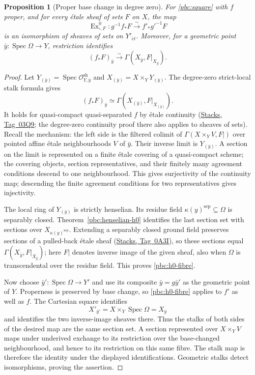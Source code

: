 \documentclass[11pt,a4paper]{article}
\numberwithin{equation}{section}
\newtheorem{proposition}[theorem]{Proposition}
\theoremstyle{definition}
\theoremstyle{remark}
\newcommand{\et}{\acute{e}t}
\newcommand{\stacks}[1]{\href{https://stacks.math.columbia.edu/tag/#1}{\textnormal{Stacks, Tag~#1}}}
\begin{document}
\begin{proposition}[Proper base change in degree zero]
\label{pbc:degree-zero}
For \eqref{pbc:square} with $f$ proper, and for every \'etale sheaf of
sets $F$ on $X$, the map
\[
 \operatorname{Ex}^0_{\square,F}:
 g^{-1}f_*F\xrightarrow{\sim} f'_*g'^{-1}F
\]
is an isomorphism of sheaves of sets on $Y'_{\et}$. Moreover, for a
geometric point $\bar y:\operatorname{Spec}\Omega\to Y$, restriction identifies
\begin{equation}\label{pbc:h0-fibre}
 (f_*F)_{\bar y}\xrightarrow{\sim}
 \Gamma(X_{\bar y},F|_{X_{\bar y}}).
\end{equation}
\end{proposition}
\begin{proof}
Let $Y_{(\bar y)}=\operatorname{Spec}\mathcal O^{\mathrm{sh}}_{Y,\bar y}$
and $X_{(\bar y)}=X\times_YY_{(\bar y)}$. The degree-zero strict-local
stalk formula gives
\[
 (f_*F)_{\bar y}\simeq\Gamma(X_{(\bar y)},F|_{X_{(\bar y)}}).
\]
It holds for quasi-compact quasi-separated $f$ by \'etale
continuity (\stacks{03Q9}; the degree-zero continuity proof there also
applies to sheaves of sets). Recall the mechanism: the left side is the
filtered colimit of $\Gamma(X\times_YV,F|)$ over pointed affine
\'etale neighbourhoods $V$ of $\bar y$. Their inverse limit is
$Y_{(\bar y)}$. A section on the limit is represented on a finite
\'etale covering of a quasi-compact scheme; the covering objects,
section representatives, and their finitely many agreement conditions
descend to one neighbourhood. This gives surjectivity of the
continuity map; descending the finite agreement conditions for two
representatives gives injectivity.

The local ring of $Y_{(\bar y)}$ is strictly henselian. Its residue
field $\kappa(y)^{\mathrm{sep}}\subseteq\Omega$ is separably closed.
Theorem~\ref{pbc:henselian-h0} identifies the last section set with
sections over $X_{\kappa(y)^{\mathrm{sep}}}$. Extending a separably
closed ground field preserves sections of a pulled-back \'etale sheaf
(\stacks{0A3I}), so these sections equal
$\Gamma(X_{\bar y},F|_{X_{\bar y}})$; here $F|$ denotes inverse
image of the given sheaf, also when $\Omega$ is transcendental over the
residue field. This proves \eqref{pbc:h0-fibre}.

Now choose $\bar y':\operatorname{Spec}\Omega\to Y'$ and use its
composite $\bar y=g\bar y'$ as the geometric point of $Y$. Properness
is preserved by base change, so \eqref{pbc:h0-fibre} applies to $f'$ as
well as $f$. The Cartesian square identifies
\[
 X'_{\bar y'}=X\times_Y\operatorname{Spec}\Omega=X_{\bar y}
\]
and identifies the two inverse-image sheaves there. Thus the stalks of
both sides of the desired map are the same section set. A section
represented over $X\times_YV$ maps under underived exchange to its
restriction over the base-changed neighbourhood, and hence to its
restriction on this same fibre. The stalk map is therefore the
identity under the displayed identifications. Geometric stalks detect
isomorphisms, proving the assertion.
\end{proof}
\end{document}
